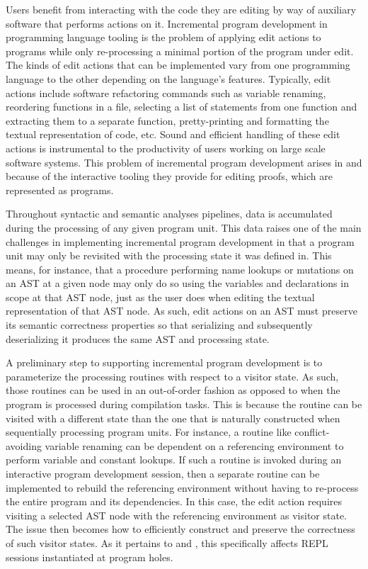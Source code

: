 Users benefit from interacting with the code they are editing by way of auxiliary software that performs actions on it.
Incremental program development in programming language tooling is the problem of applying edit actions to programs while only re-processing a minimal portion of the program under edit.
The kinds of edit actions that can be implemented vary from one programming language to the other depending on the language's features.
Typically, edit actions include software refactoring commands such as variable renaming, reordering functions in a file, selecting a list of statements from one function and extracting them to a separate function, pretty-printing and formatting the textual representation of code, etc.
Sound and efficient handling of these edit actions is instrumental to the productivity of users working on large scale software systems.
This problem of incremental program development arises in \Beluga and \Harpoon because of the interactive tooling they provide for editing proofs, which are represented as programs.


Throughout syntactic and semantic analyses pipelines, data is accumulated during the processing of any given program unit.
This data raises one of the main challenges in implementing incremental program development in that a program unit may only be revisited with the processing state it was defined in.
This means, for instance, that a procedure performing name lookups or mutations on an \ac{AST} at a given node may only do so using the variables and declarations in scope at that \ac{AST} node, just as the user does when editing the textual representation of that \ac{AST} node.
As such, edit actions on an \ac{AST} must preserve its semantic correctness properties so that serializing and subsequently deserializing it produces the same \ac{AST} and processing state.


A preliminary step to supporting incremental program development is to parameterize the processing routines with respect to a visitor state.
As such, those routines can be used in an out-of-order fashion as opposed to when the program is processed during compilation tasks.
This is because the routine can be visited with a different state than the one that is naturally constructed when sequentially processing program units.
For instance, a routine like conflict-avoiding variable renaming can be dependent on a referencing environment to perform variable and constant lookups.
If such a routine is invoked during an interactive program development session, then a separate routine can be implemented to rebuild the referencing environment without having to re-process the entire program and its dependencies.
In this case, the edit action requires visiting a selected \ac{AST} node with the referencing environment as visitor state.
The issue then becomes how to efficiently construct and preserve the correctness of such visitor states.
As it pertains to \Beluga and \Harpoon, this specifically affects \ac{REPL} sessions instantiated at program holes.

